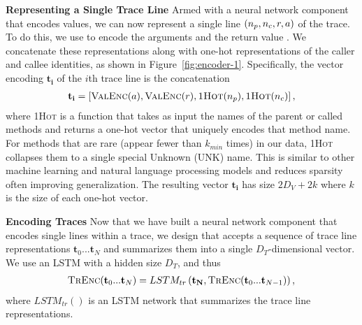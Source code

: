 \textbf{Representing a Single Trace Line}
\newcommand{\OneHot}{\textsc{1Hot}\xspace}
Armed with a neural network component that encodes values, we can now represent a single line $(n_p, n_c, r, a)$ of the trace. To do this, we use \valEncoder to encode the arguments \argVals and the return value \rVal. We concatenate these representations along with one-hot representations of the caller and callee identities, as shown in Figure~\ref{fig:encoder-1}. Specifically,
the vector encoding $\mathbf{t_i}$ of the $i$th trace line is the concatenation
\begin{align*}
	\mathbf{t_i} = \left[ \valEncoder(\argVals), \valEncoder(\rVal), \OneHot(\callerName), \OneHot(\calleeName) \right],
\end{align*}
where \OneHot is a function that takes as input the names of the parent or called methods and returns a one-hot vector that uniquely encodes that method name. For methods that are rare (appear fewer than $k_{min}$ times) in our data, \OneHot collapses them to a single special Unknown (UNK) name. This is similar to other machine learning and natural language processing models and reduces sparsity often improving generalization.
The resulting vector $\mathbf{t_i}$ has size $2D_V+2k$ where $k$ is the size of each one-hot vector.

\textbf{Encoding Traces}
Now that we have built a neural network component that encodes single lines within a trace, we design \traceEncoder that accepts a sequence of trace line representations $\mathbf{t}_0 ... \mathbf{t}_N$ and summarizes them into a single $D_T$-dimensional vector. We use an LSTM with a hidden size $D_T$, and thus
\begin{align*}
	\textsc{TrEnc}(\mathbf{t}_0 ... \mathbf{t}_N) = LSTM_{tr}\left(\mathbf{t_N}, \textsc{TrEnc}(\mathbf{t}_0 ... \mathbf{t}_{N-1}) \right),
\end{align*}
where $LSTM_{tr}()$ is an LSTM network that summarizes the trace line representations. %

\iffalse
\textcolor{red}{\textbf{Encoding Global State} We encode the final values of global variables in each trace. %
Assuming global variables $g_0, ..., g_M$, we first encode them using \valEncoder and then summarize the global state into a single vector
\begin{align*}
\mathbf{r}_G = \textsc{Pool}(\valEncoder(g_0), ... \valEncoder(g_M)),
\end{align*}
where \textsc{Pool} is a permutation-invariant pooling function and $\mathbf{r}_G$ is a $D_V$-sized vector. In this work, we use max pooling (i.e. element-wise maximum). Note that the permutation invariance is a necessary design requirement since the representation of the global state should be invariant to the ordering of the global variables. Figure~\ref{fig:encoder-2} shows \traceEncoder along with global state encoding.}
\fi

